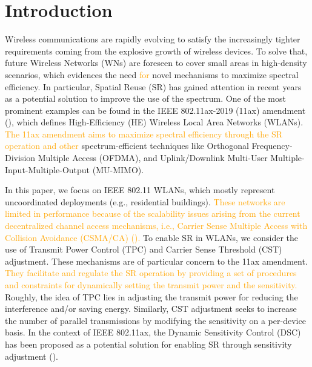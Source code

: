 \documentclass[preprint,12pt]{elsarticle}
\begin{document}
\newpage

\section{Introduction}
\label{section:introduction}
Wireless communications are rapidly evolving to satisfy the increasingly tighter requirements coming from the explosive growth of wireless devices. To solve that, future Wireless Networks (WNs) are foreseen to cover small areas in high-density scenarios, which evidences the need \textcolor{orange}{for} novel mechanisms to maximize spectral efficiency. In particular, Spatial Reuse (SR) has gained attention in recent years as a potential solution to improve the use of the spectrum. One of the most prominent examples can be found in the IEEE 802.11ax-2019 (11ax) amendment (\citealp{bellalta2016ax}), which defines High-Efficiency (HE) Wireless Local Area Networks (WLANs). \textcolor{orange}{The 11ax amendment aims to maximize spectral efficiency through the SR operation and other} spectrum-efficient techniques like Orthogonal Frequency-Division Multiple Access (OFDMA), and Uplink/Downlink Multi-User Multiple-Input-Multiple-Output (MU-MIMO).

In this paper, we focus on IEEE 802.11 WLANs, which mostly represent uncoordinated deployments (e.g., residential buildings). \textcolor{orange}{These networks are limited in performance because of the scalability issues arising from the current decentralized channel access mechanisms, i.e., Carrier Sense Multiple Access with Collision Avoidance (CSMA/CA) (\citealp{ergin2007understanding}).} To enable SR in WLANs, we consider the use of Transmit Power Control (TPC) and Carrier Sense Threshold (CST) adjustment. These mechanisms are of particular concern to the 11ax amendment. \textcolor{orange}{They facilitate and regulate the SR operation by providing a set of procedures and constraints for dynamically setting the transmit power and the sensitivity.} Roughly, the idea of TPC lies in adjusting the transmit power for reducing the interference and/or saving energy. Similarly, CST adjustment seeks to increase the number of parallel transmissions by modifying the sensitivity on a per-device basis. In the context of IEEE 802.11ax, the Dynamic Sensitivity Control (DSC) has been proposed as a potential solution for enabling SR through sensitivity adjustment (\citealp{smith2015dynamic}).
\end{document}
